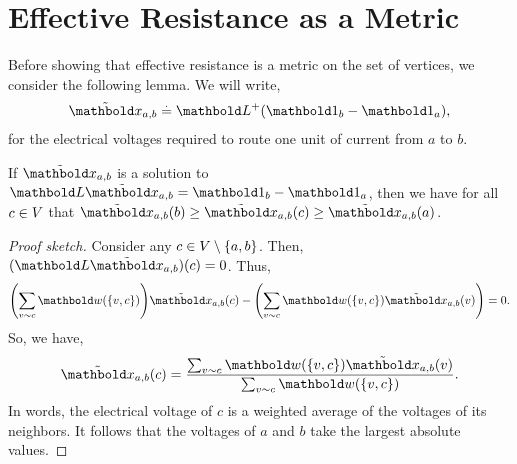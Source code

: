 \section{Effective Resistance as a Metric}

Before showing that effective resistance is a metric on the set of vertices, we consider the following lemma. We will write, \begin{align}
    \ex_{a,b} \defeq \pinv{\mL}(\vOne_b - \vOne_a),
\end{align} for the electrical voltages required to route one unit of current from $a$ to $b$.

\begin{lem}\label{lem:voltages_are_weighted_average}
If $\ex_{a,b}$ is a solution to $\mL\ex_{a,b} = \vOne_b - \vOne_a$, then we have for all $c \in V$ that $\ex_{a,b}(b) \geq \ex_{a,b}(c) \geq \ex_{a,b}(a)$.
\end{lem}
\begin{proof}[Proof sketch] Consider any $c \in V \setminus \{a,b\}$. Then, $(\mL\ex_{a,b})(c) = 0$. Thus, \begin{align*}
    \parentheses*{\sum_{v \sim c} \vw(\{v,c\})} \ex_{a,b}(c) - \parentheses*{\sum_{v \sim c} \vw(\{v,c\}) \ex_{a,b}(v)} = 0.
\end{align*} So, we have, \begin{align*}
    \ex_{a,b}(c) = \frac{\sum_{v \sim c} \vw(\{v,c\}) \ex_{a,b}(v)}{\sum_{v \sim c} \vw(\{v,c\})}.
\end{align*} In words, the electrical voltage of $c$ is a weighted average of the voltages of its neighbors. It follows that the voltages of $a$ and $b$ take the largest absolute values.
\end{proof}

